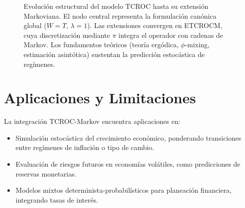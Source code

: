\begin{figure}[H]
\caption{Evolución estructural del modelo TCROC hasta su extensión Markoviana. El nodo central representa la formulación canónica global ($W=T$, $\lambda=1$). Las extensiones convergen en ETCROCM, cuya discretización mediante $\pi$ integra el operador con cadenas de Markov. Los fundamentos teóricos (teoría ergódica, $\phi$-mixing, estimación asintótica) sustentan la predicción estocástica de regímenes.}
\label{fig:tcroc_markov_completo}
\end{figure}

\section{Aplicaciones y Limitaciones}
\label{sec:markov_aplicaciones}

La integración TCROC-Markov encuentra aplicaciones en:
\begin{itemize}
    \item Simulación estocástica del crecimiento económico, ponderando transiciones entre regímenes de inflación o tipo de cambio.
    \item Evaluación de riesgos futuros en economías volátiles, como predicciones de reservas monetarias.
    \item Modelos mixtos determinista-probabilísticos para planeación financiera, integrando tasas de interés.
\end{itemize}


